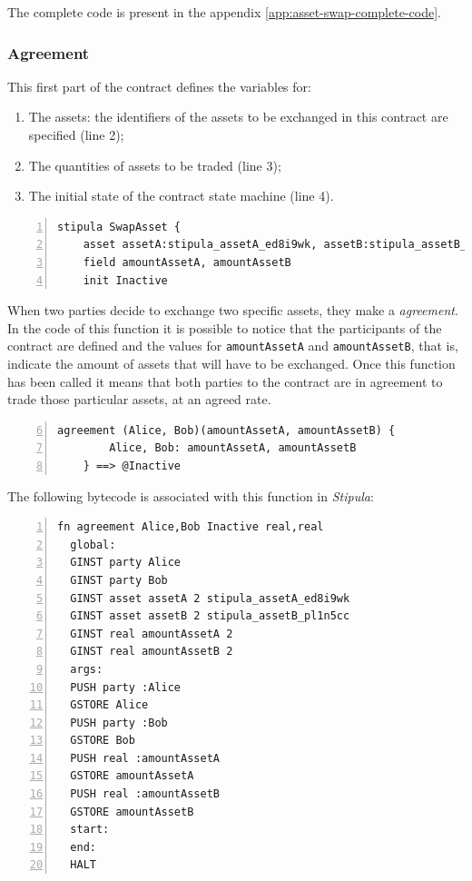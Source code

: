 The complete code is present in the appendix \ref{app:asset-swap-complete-code}.

\subsubsection{Agreement}

This first part of the contract defines the variables for:
\begin{enumerate}
  \item The assets: the identifiers of the assets to be exchanged in this contract are specified (line 2);
  \item The quantities of assets to be traded (line 3);
  \item The initial state of the contract state machine (line 4).
\end{enumerate}

\begin{Verbatim}[numbers=left,xleftmargin=1cm,firstnumber=1,breaklines=true,tabsize=2]
  stipula SwapAsset {
    asset assetA:stipula_assetA_ed8i9wk, assetB:stipula_assetB_pl1n5cc
    field amountAssetA, amountAssetB
    init Inactive
\end{Verbatim}

When two parties decide to exchange two specific assets, they make a \textit{agreement}. In the code of 
this function it is possible to notice that the participants of the contract are defined and the values 
for \verb|amountAssetA| and \verb|amountAssetB|, that is, indicate the amount of assets that will have to 
be exchanged. Once this function has been called it means that both parties to the contract are in 
agreement to trade those particular assets, at an agreed rate.

\begin{Verbatim}[numbers=left,xleftmargin=1cm,firstnumber=6,tabsize=2]
  agreement (Alice, Bob)(amountAssetA, amountAssetB) {
        Alice, Bob: amountAssetA, amountAssetB
    } ==> @Inactive
\end{Verbatim}

\newpage
The following bytecode is associated with this function in \textit{Stipula}:
\begin{Verbatim}[numbers=left,xleftmargin=1cm,firstnumber=1,tabsize=2]
  fn agreement Alice,Bob Inactive real,real
  global:
  GINST party Alice
  GINST party Bob
  GINST asset assetA 2 stipula_assetA_ed8i9wk
  GINST asset assetB 2 stipula_assetB_pl1n5cc
  GINST real amountAssetA 2
  GINST real amountAssetB 2
  args:
  PUSH party :Alice
  GSTORE Alice
  PUSH party :Bob
  GSTORE Bob
  PUSH real :amountAssetA
  GSTORE amountAssetA
  PUSH real :amountAssetB
  GSTORE amountAssetB
  start:
  end:
  HALT
\end{Verbatim}

